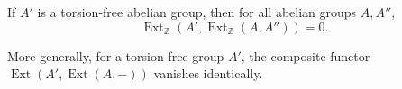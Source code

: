 If $A'$ is a torsion-free abelian group, then for all abelian groups $A, A''$,
$$\operatorname{Ext}_{\mathbb{Z}}(A', \operatorname{Ext}_{\mathbb{Z}}(A, A'')) = 0.$$

More generally, for a torsion-free group $A'$, the composite functor $\operatorname{Ext}(A', \operatorname{Ext}(A, -))$ vanishes identically.
